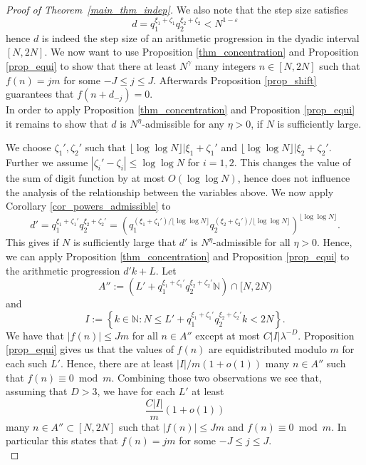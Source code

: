 \documentclass[12pt]{amsart}
\renewcommand{\leq}{\leqslant}
\theoremstyle{definition}
\numberwithin{equation}{section}
\numberwithin{equation}{section}
\begin{document}
\begin{proof}[Proof of Theorem~\ref{main_thm_indep}]
	We also note that the step size satisfies
	\[
	d = q_1^{\xi_1+\zeta_1}q_2^{\xi_2+\zeta_2}<N^{1-\varepsilon}
	\]
	hence $d$ is indeed the step size of an arithmetic progression in the dyadic interval $[N,2N]$. We now want to use Proposition \ref{thm_concentration} and Proposition \ref{prop_equi} to show that there at least $N^{\gamma}$ many integers $n\in [N,2N]$ such that $f(n)=jm$ for some $-J\leq j\leq J$. Afterwards Proposition \ref{prop_shift} guarantees that $f(n+d_{-j})=0$.\\
	
	In order to apply Proposition \ref{thm_concentration} and Proposition \ref{prop_equi} it remains to show that $d$ is $N^{\eta}$-admissible for any $\eta>0$, if $N$ is sufficiently large.
	
	We choose $\zeta_1',\zeta_2'$ such that $\lfloor\log\log N\rfloor|\xi_1+\zeta_1'$ and $\lfloor\log\log N\rfloor|\xi_2+\zeta_2'$. Further we assume $|\zeta_i'-\zeta_i|\leq \log\log N$ for $i=1,2$. This changes the value of the sum of digit function by at most $O(\log\log N)$, hence does not influence the analysis of the relationship between the variables above. We now apply Corollary \ref{cor_powers_admissible} to 
	\[
	d'=q_1^{\xi_1+\zeta_1'}q_2^{\xi_2+\zeta_2'}=\left(q_1^{(\xi_1+\zeta_1')/\lfloor\log\log N\rfloor}q_2^{(\xi_2+\zeta_2')/\lfloor\log\log N\rfloor}\right)^{\lfloor\log\log N\rfloor}.
	\]
	This gives if $N$ is sufficiently large that $d'$ is $N^{\eta}$-admissible for all $\eta>0$. Hence, we can apply Proposition \ref{thm_concentration} and Proposition \ref{prop_equi} to the arithmetic progression $d'k+L$. Let
	\begin{equation}
		A'':=\left(L'+q_1^{\xi_1+\zeta_1'}q_2^{\xi_2+\zeta_2'}\mathbb{N}\right)\cap [N,2N)
	\end{equation}
	and
	\begin{equation}
	I:=\left\{k\in\mathbb{N}:N\leq L'+q_1^{\xi_1+\zeta_1'}q_2^{\xi_2+\zeta_2'} k< 2N\right\}.
\end{equation}
	We have that $|f(n)|\leq Jm$ for all $n\in A''$ except at most $C|I|\lambda^{-D}$.	Proposition \ref{prop_equi} gives us that the values of $f(n)$ are equidistributed modulo $m$ for each such $L'$. Hence, there are at least $|I|/m(1+o(1))$ many $n\in A''$ such that $f(n)\equiv 0 \bmod m$. Combining those two observations we see that, assuming that $D>3$, we have for each $L'$ at least
	\[
	\frac{C|I|}{m}(1+o(1))
	\]
	many $n\in A''\subset [N,2N]$ such that $|f(n)|\leq Jm$ and $f(n)\equiv 0 \bmod m$. In particular this states that $f(n)=jm$ for some $-J\leq j\leq J$.\\

\end{proof}
\end{document}
